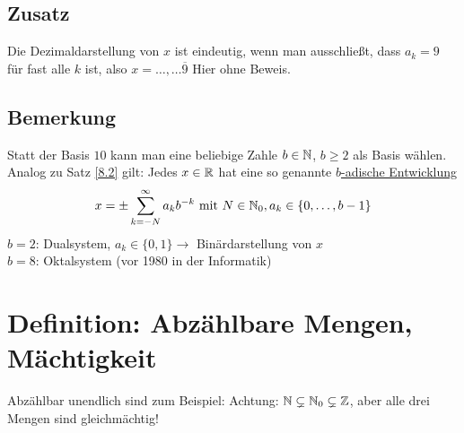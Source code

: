 \fancyhead[R]{}
\subsection*{Zusatz}
Die Dezimaldarstellung von $x$ ist eindeutig, wenn man ausschließt, dass $a_k=9$ für fast alle $k$ ist, also $x=\ldots,\ldots \overline{9}$\nl
Hier ohne Beweis.

\subsection*{Bemerkung}
Statt der Basis $10$ kann man eine beliebige Zahle $b \in \mathbb{N}$, $b \ge 2$ als Basis wählen.\\
Analog zu Satz \ref{8.2} gilt: Jedes $x \in \mathbb{R}$ hat eine so genannte \underline{$b$-adische Entwicklung}
$$x = \pm \sum_{k=-N}^\infty a_k b^{-k} \text{ mit } N \in \mathbb{N}_0, a_k \in \{0, \ldots, b-1\}$$
$b = 2$: Dualsystem, $a_k \in \{0,1\} \to$ Binärdarstellung von $x$\\
$b = 8$: Oktalsystem (vor 1980 in der Informatik)

\section{Definition: Abzählbare Mengen, Mächtigkeit}\label{8.3}
Abzählbar unendlich sind zum Beispiel:
Achtung: $\mathbb{N} \subsetneq \mathbb{N}_0 \subsetneq \mathbb{Z}$, aber alle drei Mengen sind gleichmächtig!

